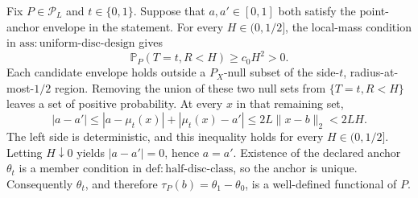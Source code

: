 Fix \(P\in\mathcal P_L\) and \(t\in\{0,1\}\).  Suppose that \(a,a'\in[0,1]\) both satisfy the point-anchor envelope in the statement.  For every \(H\in(0,1/2]\), the local-mass condition in \(\mathrm{ass:uniform\text{-}disc\text{-}design}\) gives
\[
 \mathbb P_P(T=t,R<H)\geq c_0H^2>0.
\]
Each candidate envelope holds outside a \(P_X\)-null subset of the side-\(t\), radius-at-most-\(1/2\) region.  Removing the union of these two null sets from \(\{T=t,R<H\}\) leaves a set of positive probability.  At every \(x\) in that remaining set,
\[
 |a-a'|
 \leq |a-\mu_t(x)|+|\mu_t(x)-a'|
 \leq 2L\lVert x-b\rVert_2
 <2LH.
\]
The left side is deterministic, and this inequality holds for every \(H\in(0,1/2]\).  Letting \(H\downarrow0\) yields \(|a-a'|=0\), hence \(a=a'\).  Existence of the declared anchor \(\theta_t\) is a member condition in \(\mathrm{def:half\text{-}disc\text{-}class}\), so the anchor is unique.  Consequently \(\theta_t\), and therefore \(\tau_P(b)=\theta_1-\theta_0\), is a well-defined functional of \(P\).